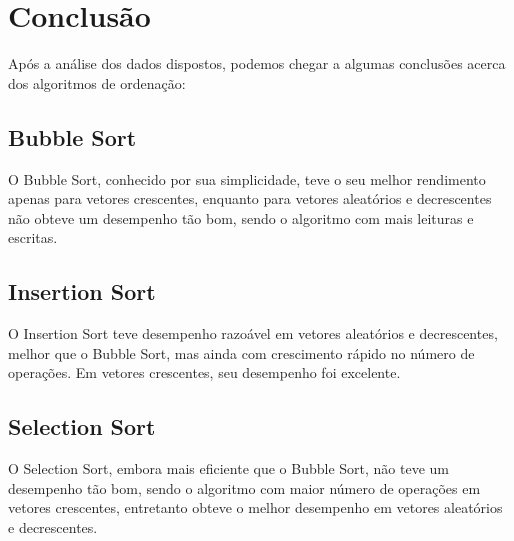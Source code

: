 \section{Conclusão}

Após a análise dos dados dispostos, podemos chegar a algumas conclusões acerca dos algoritmos de ordenação:

\subsection{Bubble Sort}

O Bubble Sort, conhecido por sua simplicidade, teve o seu melhor rendimento apenas para vetores crescentes, enquanto para vetores aleatórios e decrescentes não obteve um desempenho tão bom, sendo o algoritmo com mais leituras e escritas.

\subsection{Insertion Sort}

O Insertion Sort teve desempenho razoável em vetores aleatórios e decrescentes, melhor que o Bubble Sort, mas ainda com crescimento rápido no número de operações. Em vetores crescentes, seu desempenho foi excelente.

\subsection{Selection Sort}

O Selection Sort, embora mais eficiente que o Bubble Sort, não teve um desempenho tão bom, sendo o algoritmo com maior número de operações em vetores crescentes, entretanto obteve o melhor desempenho em vetores aleatórios e decrescentes.